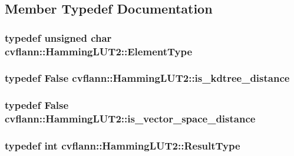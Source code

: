 \subsection{Member Typedef Documentation}
\hypertarget{structcvflann_1_1HammingLUT2_a055b0a7a52a889073ce9a8ede7274f0f}{
\subsubsection[{Element\-Type}]{\setlength{\rightskip}{0pt plus 5cm}typedef unsigned char {\bf cvflann\-::\-Hamming\-L\-U\-T2\-::\-Element\-Type}}}\label{structcvflann_1_1HammingLUT2_a055b0a7a52a889073ce9a8ede7274f0f}
\hypertarget{structcvflann_1_1HammingLUT2_a820002d9bc643ea44980001e7e67e4cf}{
\subsubsection[{is\-\_\-kdtree\-\_\-distance}]{\setlength{\rightskip}{0pt plus 5cm}typedef {\bf False} {\bf cvflann\-::\-Hamming\-L\-U\-T2\-::is\-\_\-kdtree\-\_\-distance}}}\label{structcvflann_1_1HammingLUT2_a820002d9bc643ea44980001e7e67e4cf}
\hypertarget{structcvflann_1_1HammingLUT2_a58948f2e905cade31416d5daa98f1d0b}{
\subsubsection[{is\-\_\-vector\-\_\-space\-\_\-distance}]{\setlength{\rightskip}{0pt plus 5cm}typedef {\bf False} {\bf cvflann\-::\-Hamming\-L\-U\-T2\-::is\-\_\-vector\-\_\-space\-\_\-distance}}}\label{structcvflann_1_1HammingLUT2_a58948f2e905cade31416d5daa98f1d0b}
\hypertarget{structcvflann_1_1HammingLUT2_ae3baeeac36b73addbd4d278444e2ecc8}{
\subsubsection[{Result\-Type}]{\setlength{\rightskip}{0pt plus 5cm}typedef int {\bf cvflann\-::\-Hamming\-L\-U\-T2\-::\-Result\-Type}}}\label{structcvflann_1_1HammingLUT2_ae3baeeac36b73addbd4d278444e2ecc8}


